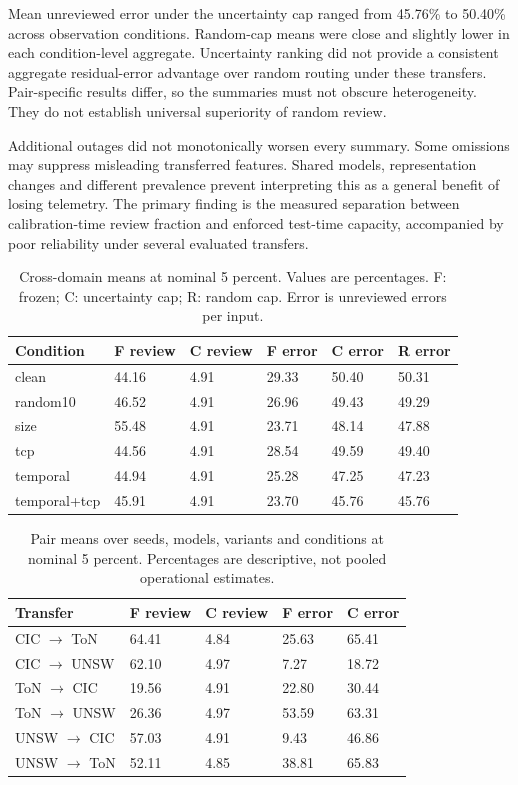 \documentclass[manuscript,screen,nonacm]{acmart}
\begin{document}
Mean unreviewed error under the uncertainty cap ranged from 45.76\% to 50.40\% across observation conditions. Random-cap means were close and slightly lower in each condition-level aggregate. Uncertainty ranking did not provide a consistent aggregate residual-error advantage over random routing under these transfers. Pair-specific results differ, so the summaries must not obscure heterogeneity. They do not establish universal superiority of random review.

Additional outages did not monotonically worsen every summary. Some omissions may suppress misleading transferred features. Shared models, representation changes and different prevalence prevent interpreting this as a general benefit of losing telemetry. The primary finding is the measured separation between calibration-time review fraction and enforced test-time capacity, accompanied by poor reliability under several evaluated transfers.

\begin{table}[t]
\centering
\caption{Cross-domain means at nominal 5 percent. Values are percentages. F: frozen; C: uncertainty cap; R: random cap. Error is unreviewed errors per input.}
\begin{tabular}{llllll}
\toprule
Condition & F review & C review & F error & C error & R error \\
\midrule
clean & 44.16 & 4.91 & 29.33 & 50.40 & 50.31 \\
random10 & 46.52 & 4.91 & 26.96 & 49.43 & 49.29 \\
size & 55.48 & 4.91 & 23.71 & 48.14 & 47.88 \\
tcp & 44.56 & 4.91 & 28.54 & 49.59 & 49.40 \\
temporal & 44.94 & 4.91 & 25.28 & 47.25 & 47.23 \\
temporal+tcp & 45.91 & 4.91 & 23.70 & 45.76 & 45.76 \\
\bottomrule
\end{tabular}
\end{table}

\begin{table}[t]
\centering
\caption{Pair means over seeds, models, variants and conditions at nominal 5 percent. Percentages are descriptive, not pooled operational estimates.}
\begin{tabular}{lllll}
\toprule
Transfer & F review & C review & F error & C error \\
\midrule
CIC $\rightarrow$ ToN & 64.41 & 4.84 & 25.63 & 65.41 \\
CIC $\rightarrow$ UNSW & 62.10 & 4.97 & 7.27 & 18.72 \\
ToN $\rightarrow$ CIC & 19.56 & 4.91 & 22.80 & 30.44 \\
ToN $\rightarrow$ UNSW & 26.36 & 4.97 & 53.59 & 63.31 \\
UNSW $\rightarrow$ CIC & 57.03 & 4.91 & 9.43 & 46.86 \\
UNSW $\rightarrow$ ToN & 52.11 & 4.85 & 38.81 & 65.83 \\
\bottomrule
\end{tabular}
\end{table}
\end{document}
